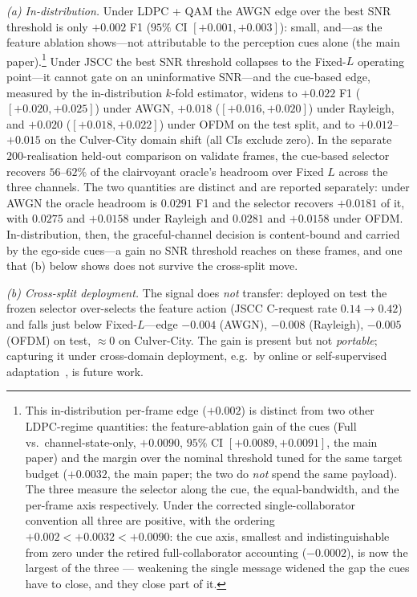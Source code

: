 \documentclass[journal]{IEEEtran}
\begin{document}
\emph{(a) In-distribution.} Under LDPC + QAM the AWGN edge over the best SNR threshold is only
$+0.002$ F1 ($95\%$ CI $[+0.001,+0.003]$): small, and---as the feature ablation shows---not
attributable to the perception cues alone
(the main paper).\footnote{This in-distribution per-frame edge ($+0.002$) is
distinct from two other LDPC-regime quantities: the feature-ablation gain of the cues (Full
vs.\ channel-state-only, $+0.0090$, $95\%$ CI $[+0.0089,+0.0091]$, the main paper) and
the margin over the nominal threshold tuned for the same target budget ($+0.0032$, the main paper; the two do \emph{not} spend the same payload). The
three measure the selector along the cue, the equal-bandwidth, and the per-frame axis respectively.
Under the corrected single-collaborator convention all three are positive, with the ordering
$+0.002 < +0.0032 < +0.0090$: the cue axis, smallest and indistinguishable from zero under the
retired full-collaborator accounting ($-0.0002$), is now the largest of the three --- weakening the
single message widened the gap the cues have to close, and they close part of it.} Under JSCC the best SNR threshold
collapses to the Fixed-$L$ operating point---it cannot gate on an uninformative SNR---and the
cue-based edge, measured by the in-distribution $k$-fold estimator, widens to $+0.022$ F1 ($[+0.020,+0.025]$) under AWGN, $+0.018$
($[+0.016,+0.020]$) under Rayleigh, and $+0.020$ ($[+0.018,+0.022]$) under OFDM on the test
split, and to $+0.012$--$+0.015$ on the Culver-City domain shift (all CIs exclude zero). In the separate $200$-realisation held-out comparison on validate frames, the
cue-based selector recovers $56$--$62\%$ of the clairvoyant oracle's headroom over Fixed $L$
across the three channels. The two quantities are distinct and are reported separately: under
AWGN the oracle headroom is $0.0291$ F1 and the selector recovers $+0.0181$ of it, with
$0.0275$ and $+0.0158$ under Rayleigh and $0.0281$ and $+0.0158$ under OFDM. In-distribution,
then, the graceful-channel decision is content-bound and carried by the ego-side cues---a
gain no SNR threshold reaches on these frames, and one that (b) below shows does not
survive the cross-split move.

\emph{(b) Cross-split deployment.} The signal does \emph{not} transfer: deployed on test the frozen selector over-selects the feature action (JSCC C-request rate $0.14\!\to\!0.42$) and falls just below Fixed-$L$---edge $-0.004$ (AWGN), $-0.008$ (Rayleigh), $-0.005$ (OFDM) on test, ${\approx}0$ on Culver-City. The gain is present but not \emph{portable}; capturing it under cross-domain deployment, e.g.\ by online or self-supervised adaptation~\cite{liu2024ssaw}, is future work.
\end{document}
